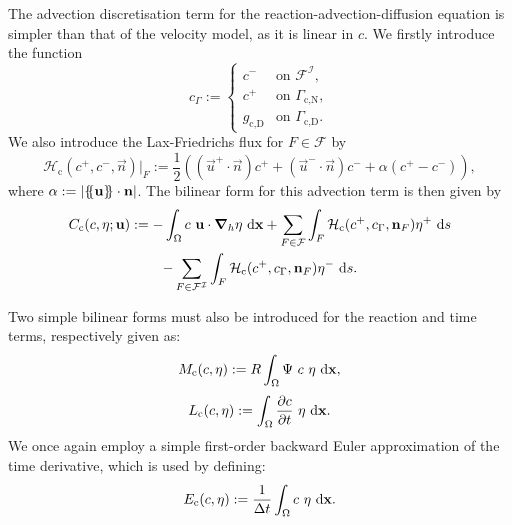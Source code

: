             The advection discretisation term for the reaction-advection-diffusion equation is simpler than that of the velocity model, as it is linear in $c$. We firstly introduce the function
            \begin{equation}
                c_\Gamma := 
                \begin{cases}
                    c^- & \text{on~} \mathcal{F}^\mathcal{I}, \\
                    c^+ & \text{on~} \Gamma_\text{c,N}, \\
                    g_\text{c,D} & \text{on~} \Gamma_\text{c,D}.
                \end{cases}
                \label{eq:c_gamma}
            \end{equation}
            We also introduce the Lax-Friedrichs flux for $F \in \mathcal{F}$ by
            \begin{equation}
                \mathcal{H}_\text{c}(c^+, c^-, \vec{n})|_F := \frac{1}{2}((\vec{u}^+ \cdot \vec{n}) c^+ + (\vec{u}^- \cdot \vec{n}) c^- + \alpha(c^+ - c^-)),
            \end{equation}
            where $\alpha := |\{\negthickspace\{\boldsymbol{\mathbf{u}}\}\negthickspace\} \cdot \boldsymbol{\mathbf{n}}|$. The bilinear form for this advection term is then given by
            \begin{multline}
                C_\text{c}(c, \eta; \boldsymbol{\mathbf{u}}) := -\int_\Omega c ~ \boldsymbol{\mathbf{u}} \cdot \boldsymbol{\mathbf{\nabla}}_h \eta ~\mathrm{d} \boldsymbol{\mathbf{x}} + \sum_{F \in \mathcal{F}} \int_F \mathcal{H}_\text{c}(c^+, c_\Gamma, \boldsymbol{\mathbf{n}}_F)\eta^+ ~\mathrm{d} s \\ - \sum_{F \in \mathcal{F}^\mathcal{I}} \int_F \mathcal{H}_\text{c}(c^+, c_\Gamma, \boldsymbol{\mathbf{n}}_F)\eta^- ~\mathrm{d} s.
            \end{multline}            

            Two simple bilinear forms must also be introduced for the reaction and time terms, respectively given as:
            \begin{equation}
                M_\text{c}(c, \eta) := R \int_\Omega \Psi ~ c ~ \eta ~\mathrm{d} \boldsymbol{\mathbf{x}},
            \end{equation}
            \begin{equation}
                L_\text{c}(c, \eta) := \int_\Omega \pdv{c}{t} ~ \eta ~\mathrm{d} \boldsymbol{\mathbf{x}}.
                \label{eq:rad-wf-time}
            \end{equation}
            We once again employ a simple first-order backward Euler approximation of the time derivative, which is used by defining:
            \begin{equation}
                E_\text{c}(c, \eta) := \frac{1}{\Delta t} \int_\Omega c ~ \eta ~\mathrm{d} \boldsymbol{\mathbf{x}}.
                \label{eq:rad-wf-time-euler}
            \end{equation}
    
